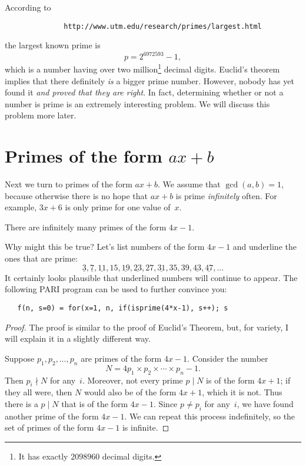 \documentclass[11pt]{report}
\newcommand{\ul}[1]{\underline{#1}}
\begin{document}
According to
\begin{verbatim}
              http://www.utm.edu/research/primes/largest.html
\end{verbatim}
the largest known prime is
$$p = 2^{6972593}-1,$$
which is a number having over two million\footnote{It has exactly $2098960$ decimal
  digits.} decimal digits.
Euclid's theorem implies that there definitely {\em is} a bigger prime number.
However, nobody has yet found it {\em and proved that they are right}.
In fact, determining whether or not a number is prime is an extremely
interesting problem.
We will discuss this problem more later.




\section{Primes of the form $ax+b$}
Next we turn to primes of the form $ax+b$.
We assume that $\gcd(a,b)=1$, because otherwise there is no
hope that $ax+b$ is prime {\em infinitely} often.
For example, $3x+6$ is only prime for one value of~$x$.

\begin{proposition}
  There are infinitely many primes of the form $4x-1$.
\end{proposition}
Why might this be true?   Let's list numbers of the form $4x-1$ and underline
the ones that are prime:
$$\ul{3}, \ul{7}, \ul{11}, 15, \ul{19}, \ul{23}, 27, \ul{31}, 35, 39,
  \ul{43}, \ul{47}, \ldots$$
It certainly looks plausible that underlined numbers will continue
to appear.  The following PARI program can be used to further convince
you:
\begin{verbatim}
   f(n, s=0) = for(x=1, n, if(isprime(4*x-1), s++); s
\end{verbatim}

\begin{proof}
  The proof is similar to the proof of Euclid's Theorem, but, for variety,
  I will explain it in a slightly different way.

  Suppose $p_1, p_2,\ldots, p_n$ are primes of the form $4x-1$.  Consider
  the number
  $$
    N = 4p_1\times p_2 \times \cdots \times p_n - 1.$$
  Then $p_i \nmid N$ for any~$i$.  Moreover, not every prime $p\mid N$ is
  of the form $4x+1$; if they all were, then $N$ would also be of the
  form $4x+1$, which it is not.
  Thus there is a $p\mid N$ that is of the form $4x-1$.  Since $p\not= p_i$
  for any~$i$, we have found another prime of the form $4x-1$.  We can repeat
  this process indefinitely, so the set of primes of the form $4x-1$
  is infinite.
\end{proof}
\end{document}
